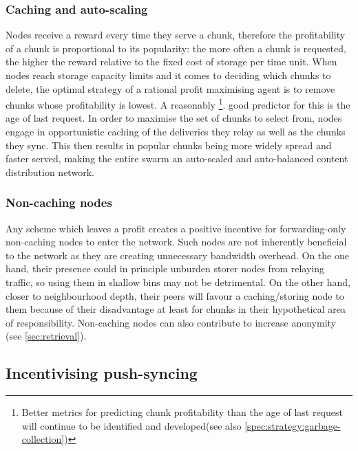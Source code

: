 \subsubsection{Caching and auto-scaling}\label{sec:caching}

Nodes receive a reward every time they serve a chunk, therefore the profitability of a chunk is proportional to its popularity: the more often a chunk is requested, the higher the reward relative to the fixed cost of storage per time unit. When nodes reach storage capacity limits and it comes to deciding which chunks to delete, the optimal strategy of a rational profit maximising agent is to remove chunks whose profitability is lowest. A reasonably%
%
\footnote{Better metrics for predicting chunk profitability than the age of last request will continue to be identified and developed(see also \ref{spec:strategy:garbage-collection})}.
good predictor for this is the age of last request. In order to maximise the set of chunks to select from, nodes engage in opportunistic caching of the deliveries they relay as well as the chunks they sync. This then results in popular chunks being more widely spread and faster served, making the entire swarm an auto-scaled and auto-balanced content distribution network.


\subsubsection{Non-caching nodes}

Any scheme which leaves  a profit creates a positive incentive for forwarding-only non-caching nodes to enter the network. Such nodes are not inherently beneficial to the network as they are creating unnecessary bandwidth overhead. On the one hand, their presence could in principle unburden storer nodes from relaying traffic, so using them in shallow bins may not be detrimental. On the other hand, closer to neighbourhood depth, their peers will favour a caching/storing node to them because of their disadvantage at least for chunks in their hypothetical area of responsibility. Non-caching nodes can also contribute to increase anonymity (see \ref{sec:retrieval}).

\subsection{Incentivising push-syncing\statusgreen}\label{sec:push-sync-incentives}

\green{}

